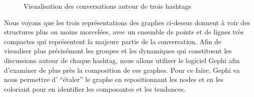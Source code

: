 \begin{figure}[th]
    \centering


  
    \caption{Visualisation des conversations autour de trois hashtags}
\end{figure}


Nous voyons que les trois représentations des graphes ci-dessus donnent à voir des structures plus ou moins morcelées, avec un ensemble de points et de lignes très compactes qui représentent la majeure partie de la conversation. Afin de visualiser plus précisément les groupes et les dynamiques qui constituent les discussions autour de chaque hashtag, nous allons utiliser le logiciel Gephi \citep{Bastian2009} afin d{\textquoteright}examiner de plus près la composition de ces graphes. Pour ce faire, Gephi va nous permettre d{\textquoteright} {\textquotedblleft}étaler{\textquotedblright} le graphe en repositionnant les nodes et en les coloriant pour en identifier les composantes et les tendances.

